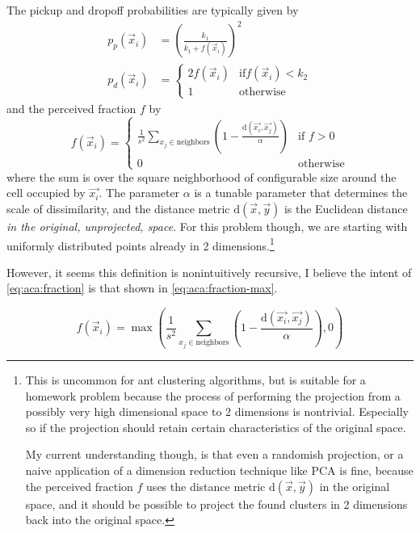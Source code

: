 \documentclass[12pt]{article}
\begin{document}
The pickup and dropoff probabilities are typically given by
\begin{align}
    p_p(\vec x_i) & = {\left(\frac{k_1}{k_1 + f(\vec x_i)}\right)}^2\label{eq:aca:pickup} \\
    p_d(\vec x_i) & = \begin{cases}
        2 f(\vec x_i) & \text{if} f(\vec x_i) < k_2 \\
        1             & \text{otherwise}
    \end{cases}\label{eq:aca:dropoff}
\end{align}
and the perceived fraction $f$ by
\begin{equation}
    f(\vec x_i) = \begin{cases}
        \displaystyle\frac{1}{s^2} \sum_{x_j \in \text{neighbors}} \left(1 -
        \frac{\mathrm{d}(\vec{x_i}, \vec{x_j})}{\alpha}\right) & \text{if } f > 0 \\
        0                                                      & \text{otherwise}
    \end{cases}\label{eq:aca:fraction}
\end{equation}
where the sum is over the square neighborhood of configurable size around the cell occupied by
$\vec{x_i}$. The parameter $\alpha$ is a tunable parameter that determines the scale of
dissimilarity, and the distance metric $\mathrm d(\vec x, \vec y)$ is the Euclidean distance
\textit{in the original, unprojected, space}. For this problem though, we are starting with
uniformly distributed points already in 2 dimensions.\footnote{This is uncommon for ant clustering
    algorithms, but is suitable for a homework problem because the process of performing the
    projection from a possibly very high dimensional space to 2 dimensions is nontrivial.
    Especially so if the projection should retain certain characteristics of the original space.

    My current understanding though, is that even a randomish projection, or a naive application of
    a dimension reduction technique like PCA is fine, because the perceived fraction $f$ uses the
    distance metric $\mathrm{d}(\vec x, \vec y)$ in the original space, and it should be possible
    to project the found clusters in 2 dimensions back into the original space.}

However, it seems this definition is nonintuitively recursive, I believe the intent of
\autoref{eq:aca:fraction} is that shown in \autoref{eq:aca:fraction-max}.

\begin{equation}
    f(\vec x_i) = \displaystyle\max\left(\frac{1}{s^2} \sum_{x_j \in \text{neighbors}} \left(1 -
        \frac{\mathrm{d}(\vec{x_i}, \vec{x_j})}{\alpha}\right), 0
    \right)\label{eq:aca:fraction-max}
\end{equation}
\end{document}
